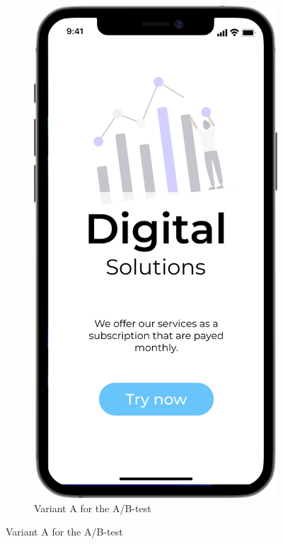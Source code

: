 \begin{figure}[t]
  \centering
  \begin{subfigure}[b]{0.45\textwidth}
    \includegraphics[width=\linewidth]{images/A.png}
    \caption{Variant A for the A/B-test}

\end{subfigure}
\end{figure}
